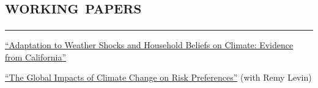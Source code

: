 \documentclass[letterpaper]{article}
\renewenvironment{itemize}{
  \begin{list}{}{
    \setlength{\leftmargin}{1em}
      \setlength{\itemsep}{0.25em}
    \setlength{\parskip}{0pt}
    \setlength{\parsep}{0pt} 
  }
}{
  \end{list}
}
\begin{document}
\section*{\textsc{\textbf{working papers}}}
\hrule
\vspace{.3cm}
\begin{itemize}

\item  \href{https://papers.ssrn.com/sol3/papers.cfm?abstract_id=3892429}{``Adaptation to Weather Shocks and Household Beliefs on Climate: Evidence from California''}
\vspace{0.1cm}

\vspace{0.2cm}


\item \href{https://papers.ssrn.com/sol3/papers.cfm?abstract_id=4132517}{``The Global Impacts of Climate Change on Risk Preferences''} (with Remy Levin) 
\vspace{0.1cm}


\end{itemize}
\end{document}

